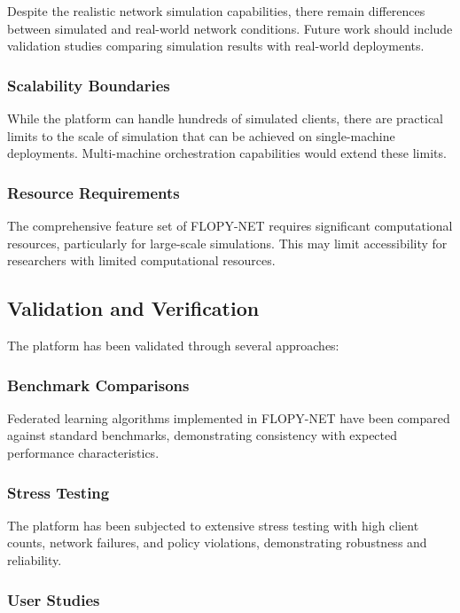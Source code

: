 Despite the realistic network simulation capabilities, there remain differences between simulated and real-world network conditions. Future work should include validation studies comparing simulation results with real-world deployments.

\subsubsection{Scalability Boundaries}

While the platform can handle hundreds of simulated clients, there are practical limits to the scale of simulation that can be achieved on single-machine deployments. Multi-machine orchestration capabilities would extend these limits.

\subsubsection{Resource Requirements}

The comprehensive feature set of FLOPY-NET requires significant computational resources, particularly for large-scale simulations. This may limit accessibility for researchers with limited computational resources.

\subsection{Validation and Verification}

The platform has been validated through several approaches:

\subsubsection{Benchmark Comparisons}

Federated learning algorithms implemented in FLOPY-NET have been compared against standard benchmarks, demonstrating consistency with expected performance characteristics.

\subsubsection{Stress Testing}

The platform has been subjected to extensive stress testing with high client counts, network failures, and policy violations, demonstrating robustness and reliability.

\subsubsection{User Studies}

